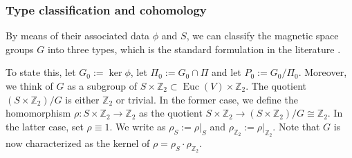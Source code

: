 \documentclass[11pt]{amsart}
\theoremstyle{definition}
\theoremstyle{plain}
\theoremstyle{remark}
\newcommand{\bZ}{\mathbb{Z}}
\DeclareMathOperator{\Euc}{Euc}
\begin{document}
\subsubsection{Type classification and cohomology}
By means of their associated data $\phi$ and $S$, we can classify the magnetic space groups $G$ into three types, which is the standard formulation in the literature \cites{lifshitzMagneticPointGroups2005,schwarzenbergerColourSymmetry1984}. 

To state this, let $G_0:=\ker \phi$, let $\Pi_0:=G_0 \cap \Pi$ and let $P_0:=G_0/\Pi_0$. Moreover, we think of $G $ as a subgroup of $S \times \bZ_2 \subset \Euc(V) \times \bZ_2$. 
The quotient $(S \times \bZ_2)/G$ is either $\bZ_2$ or trivial. 
In the former case, we define the homomorphism $\rho \colon S \times \bZ_2 \to \bZ_2$ as the quotient $S \times \bZ_2 \to (S \times \bZ_2)/G \cong \bZ_2$. 
In the latter case, set $\rho \equiv 1$. 
We write as $\rho_S:=\rho|_S$ and $\rho_{\bZ_2}:=\rho|_{\bZ_2}$. 
Note that $G$ is now characterized as the kernel of $\rho=\rho_S \cdot \rho_{\bZ_2}$.
\end{document}
